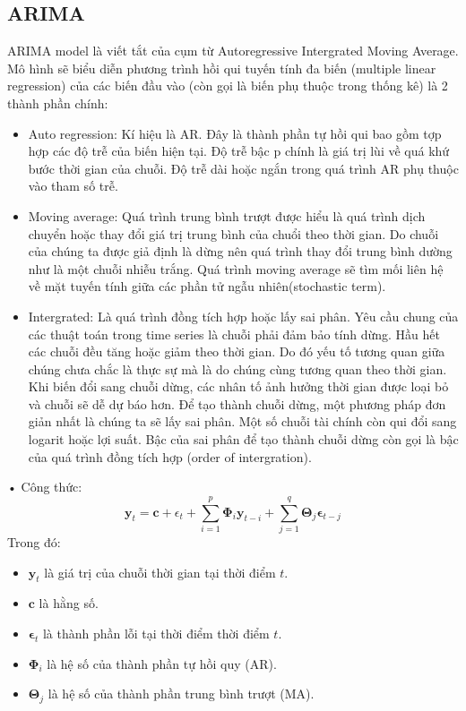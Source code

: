 \documentclass[conference]{IEEEtran}
\begin{document}
    \subsection{ARIMA}
    ARIMA model là viết tắt của cụm từ Autoregressive 
    Intergrated Moving Average. Mô hình sẽ biểu diễn phương trình hồi qui tuyến tính đa biến (multiple linear regression) của các biến đầu vào (còn gọi là biến phụ thuộc trong thống kê) là 2 thành phần chính:\\
    \begin{itemize}
        \item Auto regression: Kí hiệu là AR. Đây là thành phần tự hồi qui bao gồm tợp hợp các độ trễ của biến hiện tại. Độ trễ bậc p chính là giá trị lùi về quá khứ  bước thời gian của chuỗi. Độ trễ dài hoặc ngắn trong quá trình AR phụ thuộc vào tham số trễ.
    \end{itemize}
    \begin{itemize}
        \item Moving average: Quá trình trung bình trượt được hiểu là quá trình dịch chuyển hoặc thay đổi giá trị trung bình của chuổi theo thời gian. Do chuỗi của chúng ta được giả định là dừng nên quá trình thay đổi trung bình dường như là một chuỗi nhiễu trắng. Quá trình moving average sẽ tìm mối liên hệ về mặt tuyến tính giữa các phần tử ngẫu nhiên(stochastic term). 
    \end{itemize}
    \begin{itemize}
        \item Intergrated: Là quá trình đồng tích hợp hoặc lấy sai phân. Yêu cầu chung của các thuật toán trong time series là chuỗi phải đảm bảo tính dừng. Hầu hết các chuỗi đều tăng hoặc giảm theo thời gian. Do đó yếu tố tương quan giữa chúng chưa chắc là thực sự mà là do chúng cùng tương quan theo thời gian. Khi biến đổi sang chuỗi dừng, các nhân tố ảnh hưởng thời gian được loại bỏ và chuỗi sẽ dễ dự báo hơn. Để tạo thành chuỗi dừng, một phương pháp đơn giản nhất là chúng ta sẽ lấy sai phân. Một số chuỗi tài chính còn qui đổi sang logarit hoặc lợi suất. Bậc của sai phân để tạo thành chuỗi dừng còn gọi là bậc của quá trình đồng tích hợp (order of intergration).
    \end{itemize}
     • Công thức:
       \begin{equation}
           \mathbf{y}_t = \mathbf{c} + {\epsilon}_t + \sum_{i=1}^{p} \mathbf{\Phi}_i \mathbf{y}_{t-i} + \sum_{j=1}^{q} \mathbf{\Theta}_j \boldsymbol{\epsilon}_{t-j} 
       \end{equation}  
   Trong đó:  
       \begin{itemize}
         \item \( \mathbf{y}_t \) là giá trị của chuỗi thời gian tại thời điểm \( t \).
         \item \( \mathbf{c} \) là hằng số.
         \item \( \boldsymbol{\epsilon}_t \) là thành phần lỗi tại thời điểm thời điểm \( t \).
         \item \( \mathbf{\Phi}_i \) là hệ số của thành phần tự hồi quy (AR).
         \item \( \mathbf{\Theta}_j \) là hệ số của thành phần trung bình trượt (MA).
       \end{itemize} 
\end{document}
